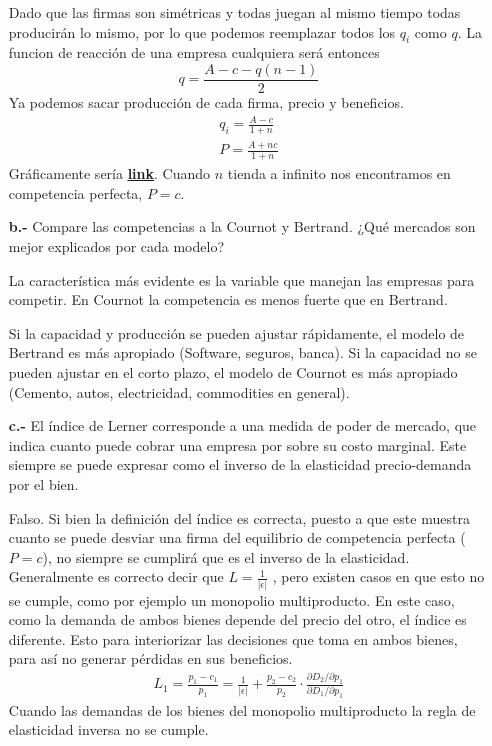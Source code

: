\begin{itemize}
\begin{solution}
        Dado que las firmas son simétricas y todas juegan al mismo tiempo todas producirán lo mismo, por lo que podemos reemplazar todos los $q_i$ como $q$. La funcion de reacción de una empresa cualquiera será entonces
        \begin{equation*}
            q  = \frac{A-c-q(n-1)}{2}
        \end{equation*}
        Ya podemos sacar producción de cada firma, precio y beneficios. 
        \begin{align}
            q_i = \frac{A-c}{1+n} \\
            P = \frac{A+nc}{1+n}
        \end{align}
        Gráficamente sería \textbf{\href{https://www.geogebra.org/calculator/ukq5pqgf}{\underline{link}}}. Cuando $n$ tienda a infinito nos encontramos en competencia perfecta, $P = c$.
    \end{solution}
    \item [\textbf{b.-}] Compare las competencias a la Cournot y Bertrand. ¿Qué mercados son mejor explicados por cada modelo? 
    \begin{solution}
        La característica más evidente es la variable que manejan las empresas para competir. En Cournot la competencia es menos fuerte que en Bertrand. 
        
        Si la capacidad y producción se pueden ajustar rápidamente, el modelo de Bertrand es más apropiado (Software, seguros, banca). Si la capacidad no se pueden ajustar en el corto plazo, el modelo de Cournot es más apropiado (Cemento, autos, electricidad, commodities en general).
    \end{solution}
    \item [\textbf{c.-}] El índice de Lerner corresponde a una medida de poder de mercado, que indica cuanto puede cobrar una empresa por sobre su costo marginal. Este siempre se puede expresar como el inverso de la elasticidad precio-demanda por el bien.
    \begin{solution}
        Falso. Si bien la definición del índice es correcta, puesto a que este muestra cuanto se puede desviar una firma del equilibrio de competencia perfecta ($P=c$), no siempre se cumplirá que es el inverso de la elasticidad. Generalmente es correcto decir que $L = \frac{1}{|\epsilon|}$ , pero existen casos en que esto no se cumple, como por ejemplo un monopolio multiproducto. En este caso, como la demanda de ambos bienes depende del precio del otro, el índice es diferente. Esto para interiorizar las decisiones que toma en ambos bienes, para así no generar pérdidas en sus beneficios.
        \begin{align*}
            L_1 = \frac{p_1-c_1}{p_1} = \frac{1}{|\epsilon|} + \frac{p_2-c_2}{p_2}\cdot \frac{\partial D_2 / \partial p_1}{\partial D_1 / \partial p_1}
        \end{align*}
        Cuando las demandas de los bienes del monopolio multiproducto la regla de elasticidad inversa no se cumple.


\end{solution}
\end{itemize}
